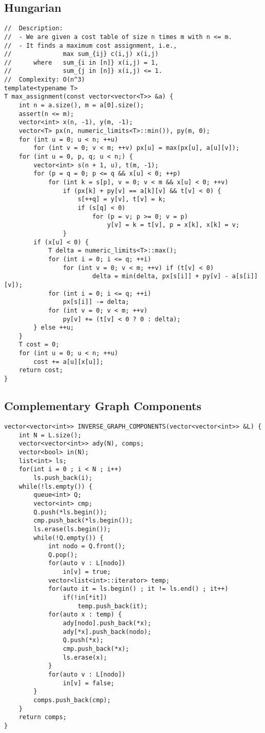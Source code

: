 \documentclass[landscape, 8pt, a4paper, oneside]{extarticle}
\begin{document}
\begin{multicols}{3}
\subsection{Hungarian}
\begin{verbatim}
//	Description:
//	- We are given a cost table of size n times m with n <= m.
//	- It finds a maximum cost assignment, i.e.,
//				max sum_{ij} c(i,j) x(i,j)
//		where   sum_{i in [n]} x(i,j) = 1,
//				sum_{j in [n]} x(i,j) <= 1.
//	Complexity: O(n^3)
template<typename T>
T max_assignment(const vector<vector<T>> &a) {
    int n = a.size(), m = a[0].size();
    assert(n <= m);
    vector<int> x(n, -1), y(m, -1);
    vector<T> px(n, numeric_limits<T>::min()), py(m, 0);
    for (int u = 0; u < n; ++u)
        for (int v = 0; v < m; ++v) px[u] = max(px[u], a[u][v]);
    for (int u = 0, p, q; u < n;) {
        vector<int> s(n + 1, u), t(m, -1);
        for (p = q = 0; p <= q && x[u] < 0; ++p)
            for (int k = s[p], v = 0; v < m && x[u] < 0; ++v)
                if (px[k] + py[v] == a[k][v] && t[v] < 0) {
                    s[++q] = y[v], t[v] = k;
                    if (s[q] < 0)
                        for (p = v; p >= 0; v = p)
                            y[v] = k = t[v], p = x[k], x[k] = v;
                }
        if (x[u] < 0) {
            T delta = numeric_limits<T>::max();
            for (int i = 0; i <= q; ++i)
                for (int v = 0; v < m; ++v) if (t[v] < 0)
                        delta = min(delta, px[s[i]] + py[v] - a[s[i]][v]);
            for (int i = 0; i <= q; ++i)
                px[s[i]] -= delta;
            for (int v = 0; v < m; ++v)
                py[v] += (t[v] < 0 ? 0 : delta);
        } else ++u;
    }
    T cost = 0;
    for (int u = 0; u < n; ++u)
        cost += a[u][x[u]];
    return cost;
}
\end{verbatim}
\subsection{Complementary Graph Components}
\begin{verbatim}
vector<vector<int>> INVERSE_GRAPH_COMPONENTS(vector<vector<int>> &L) {
    int N = L.size();
    vector<vector<int>> ady(N), comps;
    vector<bool> in(N);
    list<int> ls;
    for(int i = 0 ; i < N ; i++)
        ls.push_back(i);
    while(!ls.empty()) {
        queue<int> Q;
        vector<int> cmp;
        Q.push(*ls.begin());
        cmp.push_back(*ls.begin());
        ls.erase(ls.begin());
        while(!Q.empty()) {
            int nodo = Q.front();
            Q.pop();
            for(auto v : L[nodo])
                in[v] = true;
            vector<list<int>::iterator> temp;
            for(auto it = ls.begin() ; it != ls.end() ; it++)
                if(!in[*it])
                    temp.push_back(it);
            for(auto x : temp) {
                ady[nodo].push_back(*x);
                ady[*x].push_back(nodo);
                Q.push(*x);
                cmp.push_back(*x);
                ls.erase(x);
            }
            for(auto v : L[nodo])
                in[v] = false;
        }
        comps.push_back(cmp);
    }
    return comps;
}
\end{verbatim}

\end{multicols}
\end{document}
